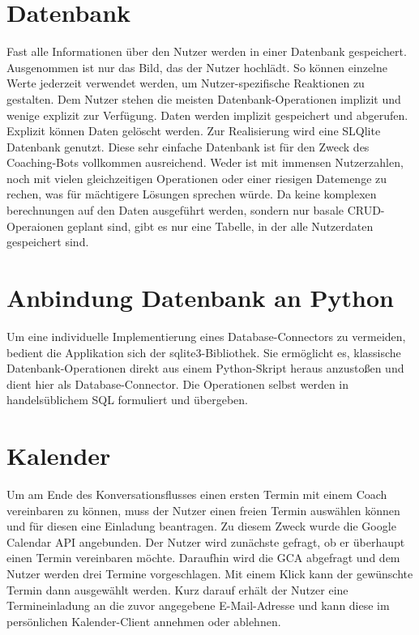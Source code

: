     \section{Datenbank}
        Fast alle Informationen über den Nutzer werden in einer Datenbank gespeichert. Ausgenommen ist nur das Bild, das der Nutzer hochlädt. So können einzelne Werte jederzeit verwendet werden, um Nutzer-spezifische Reaktionen zu gestalten.
        Dem Nutzer stehen die meisten Datenbank-Operationen implizit und wenige explizit zur Verfügung. Daten werden implizit gespeichert und abgerufen. Explizit können Daten gelöscht werden. Zur Realisierung wird eine SLQlite Datenbank genutzt. Diese sehr einfache Datenbank ist für den Zweck des Coaching-Bots vollkommen ausreichend. Weder ist mit immensen Nutzerzahlen, noch mit vielen gleichzeitigen Operationen oder einer riesigen Datemenge zu rechen, was für mächtigere Lösungen sprechen würde.
        Da keine komplexen berechnungen auf den Daten ausgeführt werden, sondern nur basale CRUD-Operaionen geplant sind, gibt es nur eine Tabelle, in der alle Nutzerdaten gespeichert sind.


    \section{Anbindung Datenbank an Python}
        Um eine individuelle Implementierung eines Database-Connectors zu vermeiden, bedient die Applikation sich der sqlite3-Bibliothek. Sie ermöglicht es, klassische Datenbank-Operationen direkt aus einem Python-Skript heraus anzustoßen und dient hier als Database-Connector. Die Operationen selbst werden in handelsüblichem SQL formuliert und übergeben.


    \section{Kalender}
        Um am Ende des Konversationsflusses einen ersten Termin mit einem Coach vereinbaren zu können, muss der Nutzer einen freien Termin auswählen können und für diesen eine Einladung beantragen. Zu diesem Zweck wurde die Google Calendar API angebunden. Der Nutzer wird zunächste gefragt, ob er überhaupt einen Termin vereinbaren möchte. Daraufhin wird die GCA abgefragt und dem Nutzer werden drei Termine vorgeschlagen. Mit einem Klick kann der gewünschte Termin dann ausgewählt werden. Kurz darauf erhält der Nutzer eine Termineinladung an die zuvor angegebene E-Mail-Adresse und kann diese im persönlichen Kalender-Client annehmen oder ablehnen. 

